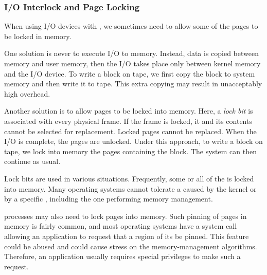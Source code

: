 \subsubsection{I/O Interlock and Page Locking}\label{IO:subsubsec_Interlock_Page_Locking}
When using I/O devices with , we sometimes need to allow some of the pages to be locked in memory.

One solution is never to execute I/O to  memory.
Instead, data is copied between  memory and user memory, then the I/O takes place only between kernel memory and the I/O device.
To write a block on tape, we first copy the block to system memory and then write it to tape.
This extra copying may result in unacceptably high overhead.

Another solution is to allow pages to be locked into memory.
Here, a \emph{lock bit} is associated with every physical frame.
If the frame is locked, it and its contents cannot be selected for replacement.
Locked pages cannot be replaced.
When the I/O is complete, the pages are unlocked.
Under this approach, to write a block on tape, we lock into memory the pages containing the block.
The system can then continue as usual.

Lock bits are used in various situations.
Frequently, some or all of the   is locked into memory.
Many operating systems cannot tolerate a  caused by the kernel or by a specific , including the one performing memory management.

 processes may also need to lock pages into memory.
Such pinning of pages in memory is fairly common, and most operating systems have a system call allowing an application to request that a region of its  be pinned.
This feature could be abused and could cause stress on the memory-management algorithms.
Therefore, an application usually requires special privileges to make such a request.

